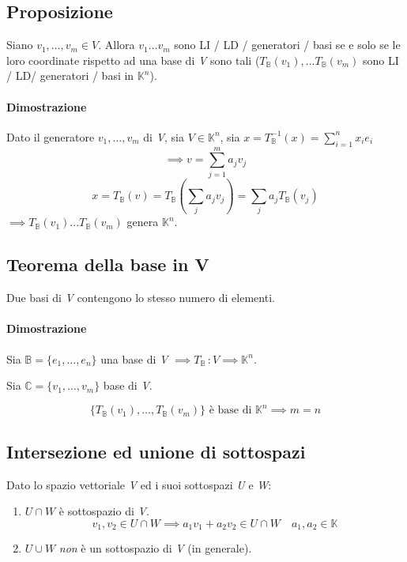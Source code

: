 		\subsection{Proposizione}
			Siano $v_1, \dots , v_m \in V$.
			Allora $v_1 \dots v_m$ sono LI / LD / generatori / basi se e solo se le loro coordinate rispetto ad una base di \textit{V} sono tali ($T_{\mathbb{B}} (v_1), \dots T_{\mathbb{B}} (v_m)$ sono LI / LD/ generatori / basi in $\mathbb{K}^n$).
			
			\begin{GrayBox}
				\paragraph{Dimostrazione}
				Dato il generatore ${v_1, \dots , v_m}$ di \textit{V}, sia $V \in \mathbb{K}^n$, sia $x = T_{\mathbb{B}}^{-1} (x) = \sum_{i=1}^{n} x_i e_i $
				$$\implies v = \sum_{j=1}^{m} a_j v_j $$
				$$ x = T_{\mathbb{B}} (v) = T_{\mathbb{B}} (\sum_{j} a_j v_j) = \sum_j a_j T_{\mathbb{B}} (v_j) $$
				$ \implies T_{\mathbb{B}} (v_1) ... T_{\mathbb{B}} (v_m) $ genera $\mathbb{K}^n$.
			\end{GrayBox}
			 
		\subsection{Teorema della base in V}
			Due basi di \textit{V} contengono lo stesso numero di elementi.
			\begin{GrayBox}
				\paragraph{Dimostrazione}
				Sia $\mathbb{B} = \{ e_1 , \dots , e_n \}$ una base di \textit{V} $\implies T_{\mathbb{B}} \, : V \implies \mathbb{K}^n$.
				
				Sia $\mathbb{C} = \{v_1 , \dots , v_m \}$ base di \textit{V}.
				
				$$ \{ T_{\mathbb{B}} (v_1) , \dots , T_{\mathbb{B}} (v_m) \} \text{ è base di } \mathbb{K}^n \implies m = n$$
			\end{GrayBox}
		\subsection{Intersezione ed unione di sottospazi}
			Dato lo spazio vettoriale \textit{V} ed i suoi sottospazi \textit{U} e \textit{W}:
			\begin{enumerate}
				\item $U \cap W$ è sottospazio di \textit{V}.
				$$v_1, v_2 \in U \cap W \implies a_1 v_1 + a_2 v_2 \in U \cap W \quad a_1 , a_2 \in \mathbb{K}$$
				\item $U \cup W$ \emph{non} è un sottospazio di \textit{V} (in generale).
			\end{enumerate}
